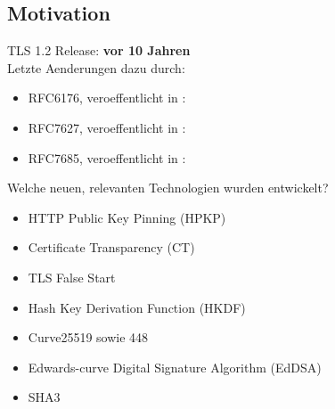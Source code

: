 \documentclass{f4_beamer_metropolis}
\begin{document}
\subsection{Motivation}

\begin{frame}{TLS 1.2}
Release: \textbf{vor 10 Jahren} \\
Letzte Aenderungen dazu durch:
\begin{itemize}
    \item RFC6176, veroeffentlicht in \textbf{\citeyear{RFC6176}}: \newline
    \textit{}
    \item RFC7627, veroeffentlicht in \textbf{\citeyear{RFC7627}}: \newline
    \textit{}
    \item RFC7685, veroeffentlicht in \textbf{\citeyear{RFC7685}}: \newline
    \textit{}
\end{itemize}
\end{frame}

\begin{frame}{Welche neuen, relevanten Technologien wurden entwickelt?}
  \begin{itemize}
    \item HTTP Public Key Pinning (HPKP) \autocite{RFC7469}
    \item Certificate Transparency (CT) \autocite{RFC6962}
    \item TLS False Start \autocite{RFC7918}
    \item Hash Key Derivation Function (HKDF) \autocite{RFC5869}
    \item Curve25519 sowie 448 \autocite{RFC7748}
    \item Edwards-curve Digital Signature Algorithm (EdDSA) \autocite{RFC8032}
    \item SHA3
  \end{itemize}

  \end{frame}
\end{document}
